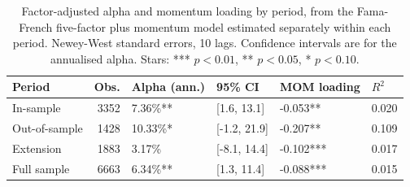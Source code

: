 \begin{table}[H]
\centering
\caption{Factor-adjusted alpha and momentum loading by period, from the Fama-French five-factor plus momentum model estimated separately within each period. Newey-West standard errors, 10 lags. Confidence intervals are for the annualised alpha. Stars: *** $p<0.01$, ** $p<0.05$, * $p<0.10$.} 
\label{tab:factor_periods}
\begin{tabular}{lrllll}
  \toprule
Period & Obs. & Alpha (ann.) & 95\% CI & MOM loading & $R^2$ \\ 
  \midrule
In-sample & 3352 & 7.36\%** & [1.6, 13.1] & -0.053** & 0.020 \\ 
  Out-of-sample & 1428 & 10.33\%* & [-1.2, 21.9] & -0.207** & 0.109 \\ 
  Extension & 1883 & 3.17\% & [-8.1, 14.4] & -0.102*** & 0.017 \\ 
  Full sample & 6663 & 6.34\%** & [1.3, 11.4] & -0.088*** & 0.015 \\ 
   \bottomrule
\end{tabular}
\end{table}
